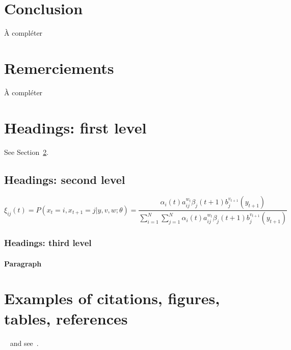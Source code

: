 \documentclass{article}
\begin{document}
  \section{Conclusion}
  À compléter

  \section*{Remerciements}
  À compléter

  
  




  \section{Headings: first level}
  \label{sec:headings}

  \lipsum[4] See Section~\ref{sec:headings}.

  \subsection{Headings: second level}
  \label{subsec:headings:second-level}
  \lipsum[5]
  \begin{equation}
    \xi _{ij}(t)=P(x_{t}=i,x_{t+1}=j|y,v,w;\theta)= {\frac {\alpha _{i}(t)a^{w_t}_{ij}\beta _{j}(t+1)b^{v_{t+1}}_{j}(y_{t+1})}{\sum _{i=1}^{N} \sum _{j=1}^{N} \alpha
    _{i}(t)a^{w_t}_{ij}\beta _{j}(t+1)b^{v_{t+1}}_{j}(y_{t+1})}}\label{eq:eq1}
  \end{equation}

  \subsubsection{Headings: third level}
  \lipsum[6]

  \paragraph{Paragraph}
  \lipsum[7]


  \section{Examples of citations, figures, tables, references}
  \label{sec:others}
  \lipsum[8]~\cite{kour2014real,kour2014fast} and see~\cite{hadash2018estimate}.
\end{document}
